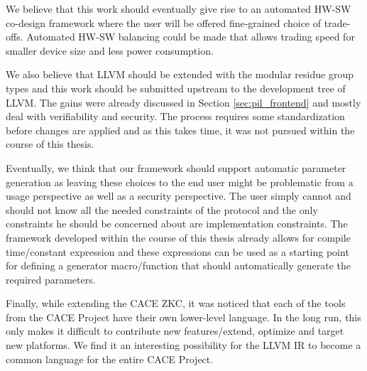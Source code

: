 We believe that this work should eventually give rise to an automated
HW-SW co-design framework where the user will be offered fine-grained
choice of trade-offs. Automated HW-SW balancing could be made that
allows trading speed for smaller device size and less power
consumption.

We also believe that LLVM should be extended with the modular residue
group types and this work should be submitted upstream to the
development tree of LLVM. The gains were already discussed in Section
\ref{sec:pil_frontend} and mostly deal with verifiability and
security. The process requires some standardization before changes are
applied and as this takes time, it was not pursued within the course
of this thesis.

Eventually, we think that our framework should support automatic
parameter generation as leaving these choices to the end user might be
problematic from a usage perspective as well as a security
perspective. The user simply cannot and should not know all the needed
constraints of the protocol and the only constraints he should be
concerned about are implementation constraints. The framework
developed within the course of this thesis already allows for compile
time/constant expression and these expressions can be used as a
starting point for defining a generator macro/function that should
automatically generate the required parameters.

Finally, while extending the CACE ZKC, it was noticed that each of the
tools from the CACE Project have their own lower-level language. In
the long run, this only makes it difficult to contribute new
features/extend, optimize and target new platforms. We find it an
interesting possibility for the LLVM IR to become a common language
for the entire CACE Project.

